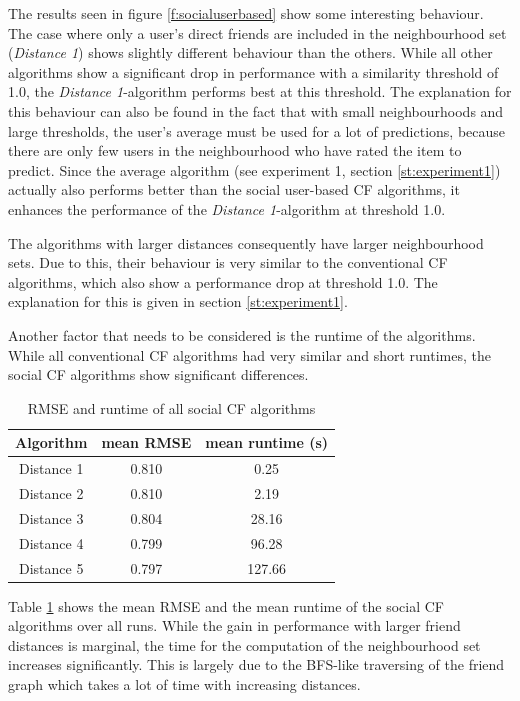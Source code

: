 The results seen in figure \ref{f:socialuserbased} show some interesting behaviour. The case where only a user's direct friends are included in the neighbourhood set (\textit{Distance 1}) shows slightly different behaviour than the others. While all other algorithms show a significant drop in performance with a similarity threshold of 1.0, the \textit{Distance 1}-algorithm performs best at this threshold. The explanation for this behaviour can also be found in the fact that with small neighbourhoods and large thresholds, the user's average must be used for a lot of predictions, because there are only few users in the neighbourhood who have rated the item to predict. Since the average algorithm (see experiment 1, section \ref{st:experiment1}) actually also performs better than the social user-based CF algorithms, it enhances the performance of the \textit{Distance 1}-algorithm at threshold 1.0.

The algorithms with larger distances consequently have larger neighbourhood sets. Due to this, their behaviour is very similar to the conventional CF algorithms, which also show a performance drop at threshold 1.0. The explanation for this is given in section \ref{st:experiment1}.
\newline

Another factor that needs to be considered is the runtime of the algorithms. While all conventional CF algorithms had very similar and short runtimes, the social CF algorithms show significant differences.

\begin{table}[h]
	\begin{center}
	\begin{tabular}{ | c | c | c |}
	\hline
	Algorithm & mean RMSE & mean runtime (s) \\ \hline
	Distance 1 & 0.810 & 0.25 \\ \hline
	Distance 2 & 0.810 & 2.19 \\ \hline
	Distance 3 & 0.804 & 28.16 \\ \hline
	Distance 4 & 0.799 & 96.28 \\ \hline
	Distance 5 & 0.797 & 127.66 \\ \hline
	\end{tabular}
	\caption{RMSE and runtime of all social CF algorithms}
	\label{t:rmseruntimesocialcf}
	\end{center}
\end{table}

Table \ref{t:rmseruntimesocialcf} shows the mean RMSE and the mean runtime of the social CF algorithms over all runs. While the gain in performance with larger friend distances is marginal, the time for the computation of the neighbourhood set increases significantly. This is largely due to the BFS-like traversing of the friend graph which takes a lot of time with increasing distances.

